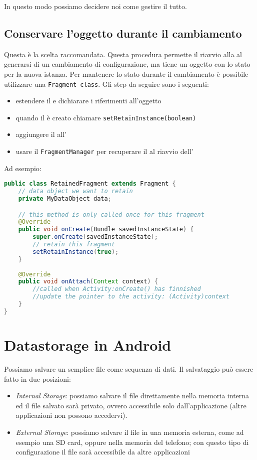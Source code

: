 In questo modo possiamo decidere noi come gestire il tutto.

\subsection{Conservare l'oggetto durante il cambiamento}
Questa è la scelta raccomandata. Questa procedura permette il riavvio alla 
\Activity al generarsi di un cambiamento di configurazione, ma tiene un oggetto
con lo stato per la nuova istanza. Per mantenere lo stato durante il 
cambiamento è possibile utilizzare una \texttt{Fragment class}.
Gli step da seguire sono i seguenti:
\begin{itemize}
    \item estendere il \Fragment e dichiarare i riferimenti all'oggetto
    \item quando il \Fragment è creato chiamare
\texttt{setRetainInstance(boolean)}
    \item aggiungere il \Fragment all'\Activity
    \item usare il \texttt{FragmentManager} per recuperare il \Fragment al
riavvio dell'\Activity

\end{itemize}

Ad esempio:

\begin{lstlisting}[language=Java]
public class RetainedFragment extends Fragment {
	// data object we want to retain
	private MyDataObject data;

	// this method is only called once for this fragment
	@Override
	public void onCreate(Bundle savedInstanceState) {
		super.onCreate(savedInstanceState);
		// retain this fragment
		setRetainInstance(true); 
	}
	
	@Override
	public void onAttach(Context context) {
		//called when Activity:onCreate() has finnished
		//update the pointer to the activity: (Activity)context
	}
}
\end{lstlisting}

\section{Datastorage in Android}
Possiamo salvare un semplice file come sequenza di dati. Il salvataggio può 
essere fatto in due posizioni:
\begin{itemize}
    \item \textit{Internal Storage}: possiamo salvare il file direttamente nella
memoria interna ed il file salvato sarà privato, ovvero accessibile solo
dall'applicazione (altre applicazioni non possono accedervi).
    \item \textit{External Storage}: possiamo salvare il file in una memoria
esterna, come ad esempio una SD card, oppure nella memoria del telefono; con
questo tipo di configurazione il file sarà accessibile da altre applicazioni
\end{itemize}

